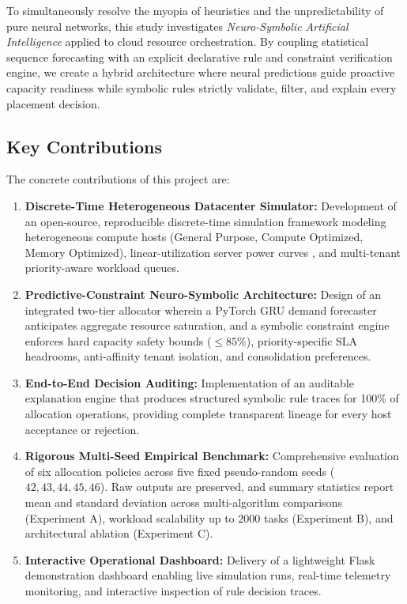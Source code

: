 \documentclass[conference]{IEEEtran}
\begin{document}
To simultaneously resolve the myopia of heuristics and the unpredictability of pure neural networks, this study investigates \textit{Neuro-Symbolic Artificial Intelligence} \cite{garcez2019neural} applied to cloud resource orchestration. By coupling statistical sequence forecasting with an explicit declarative rule and constraint verification engine, we create a hybrid architecture where neural predictions guide proactive capacity readiness while symbolic rules strictly validate, filter, and explain every placement decision.

\subsection{Key Contributions}
The concrete contributions of this project are:
\begin{enumerate}
    \item \textbf{Discrete-Time Heterogeneous Datacenter Simulator:} Development of an open-source, reproducible discrete-time simulation framework modeling heterogeneous compute hosts (General Purpose, Compute Optimized, Memory Optimized), linear-utilization server power curves \cite{fan2007power}, and multi-tenant priority-aware workload queues.
    \item \textbf{Predictive-Constraint Neuro-Symbolic Architecture:} Design of an integrated two-tier allocator wherein a PyTorch GRU demand forecaster anticipates aggregate resource saturation, and a symbolic constraint engine enforces hard capacity safety bounds ($\le 85\%$), priority-specific SLA headrooms, anti-affinity tenant isolation, and consolidation preferences.
    \item \textbf{End-to-End Decision Auditing:} Implementation of an auditable explanation engine that produces structured symbolic rule traces for 100\% of allocation operations, providing complete transparent lineage for every host acceptance or rejection.
    \item \textbf{Rigorous Multi-Seed Empirical Benchmark:} Comprehensive evaluation of six allocation policies across five fixed pseudo-random seeds ($42, 43, 44, 45, 46$). Raw outputs are preserved, and summary statistics report mean and standard deviation across multi-algorithm comparisons (Experiment A), workload scalability up to 2000 tasks (Experiment B), and architectural ablation (Experiment C).
    \item \textbf{Interactive Operational Dashboard:} Delivery of a lightweight Flask demonstration dashboard enabling live simulation runs, real-time telemetry monitoring, and interactive inspection of rule decision traces.
\end{enumerate}
\end{document}
